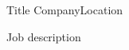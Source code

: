 \documentclass[../resume.tex]{subfiles}
\begin{document}
{Title}
{Company}{Location}
{
  \item Job description
}
\end{document}
